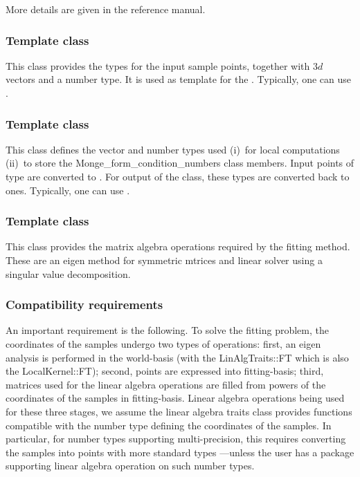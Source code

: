 More details are given in the reference manual.

\subsubsection{Template class }

This class provides the types for the input sample points, together
with $3d$ vectors and a number type. It is used as template for the
. Typically, one can use .

\subsubsection{Template class }

This class defines the vector and number types used (i)\ for local
computations (ii)\ to store the Monge\_form\_condition\_numbers class members. Input
points of type  are converted to
. For output of the  class, these
types are converted back to  ones.  Typically, one can use
.

\subsubsection{Template class }

This class provides the matrix algebra operations required by the
fitting method. These are an eigen method for symmetric mtrices and
linear solver using a singular value decomposition.

\subsubsection{Compatibility requirements}

An important requirement is the following. To solve the fitting
problem, the coordinates of the samples undergo two types of
operations: first, an eigen analysis is performed in the world-basis
(with the LinAlgTraits::FT which is also the LocalKernel::FT); second,
points are expressed into fitting-basis; third, matrices used for the
linear algebra operations are filled from powers of the coordinates of
the samples in fitting-basis. Linear algebra operations being used for
these three stages, we assume the linear algebra traits class provides
functions compatible with the number type defining the coordinates of
the samples. In particular, for number types supporting
multi-precision, this requires converting the samples into points with
more standard types ---unless the user has a package supporting linear
algebra operation on such number types.





